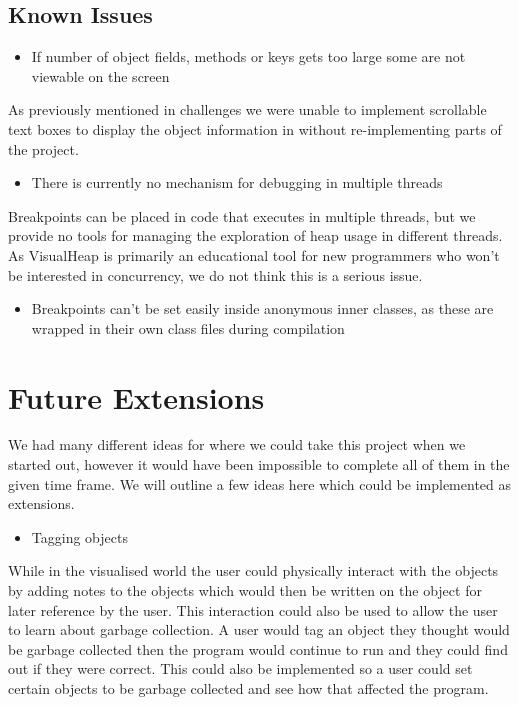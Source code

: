 \documentclass[11pt, a4paper]{report}
\begin{document}
\section{Known Issues}

\begin{itemize}
  \item If number of object fields, methods or keys gets too large some are not viewable on the screen
\end{itemize}

As previously mentioned in challenges we were unable to implement scrollable text boxes to display the object information in without re-implementing parts of the project.

\begin{itemize}
  \item There is currently no mechanism for debugging in multiple threads
\end{itemize}

Breakpoints can be placed in code that executes in multiple threads, but we provide no tools for managing the exploration of heap usage in different threads.  As VisualHeap is primarily an educational tool for new programmers who won’t be interested in concurrency, we do not think this is a serious issue.

\begin{itemize}
  \item Breakpoints can’t be set easily inside anonymous inner classes, as these are wrapped in their own class files during compilation
\end{itemize}

\chapter{Future Extensions}

We had many different ideas for where we could take this project when we started out, however it would have been impossible to complete all of them in the given time frame. We will outline a few ideas here which could be implemented as extensions.

\begin{itemize}
  \item Tagging objects
\end{itemize}

While in the visualised world the user could physically interact with the objects by adding notes to the objects which would then be written on the object for later reference by the user. This interaction could also be used to allow the user to learn about garbage collection. A user would tag an object they thought would be garbage collected then the program would continue to run and they could find out if they were correct. This could also be implemented so a user could set certain objects to be garbage collected and see how that affected the program.
\end{document}
